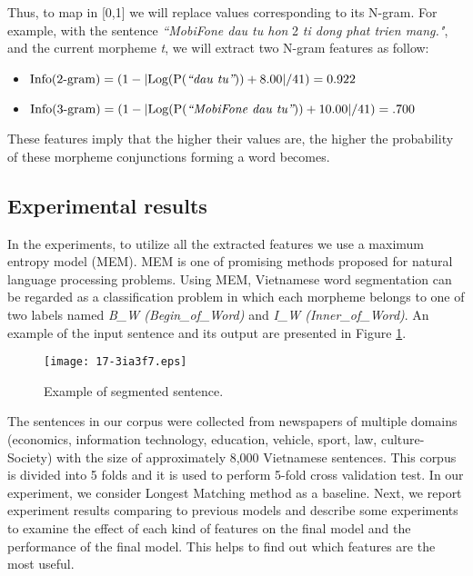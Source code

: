 \documentclass[english]{jnlp_1.4}
\begin{document}
 Thus, to map in [0,1] we will replace values corresponding to its N-gram.
  For example, with the sentence \textit{``MobiFone dau tu hon} 2 \textit{ti dong phat trien mang."}, 
and the current morpheme \emph{t}, we will extract two N-gram features as follow:
\begin{itemize}
  \item $\text{Info(2-gram)} = (1 - |\text{Log(P({\itshape ``dau tu''}))} + 8.00|/41) = 0.922$
  \item $\text{Info(3-gram)} = (1 - |\text{Log(P({\itshape ``MobiFone dau tu''}))} + 10.00|/41) = .700$
\end{itemize}
These features imply that the higher their values are, the higher the
probability of these morpheme conjunctions forming a word becomes.


\subsection{Experimental results}

In the experiments, to utilize all the extracted features we use a maximum entropy model (MEM).
MEM is one of promising methods proposed for natural language processing problems.
Using MEM, Vietnamese word segmentation can be regarded as
a classification problem in which each morpheme belongs to one of two
labels named \emph{B\_W (Begin\_of\_Word)} and \emph{I\_W (Inner\_of\_Word)}.
An example of the input sentence and its output are presented in Figure \ref{f14}.

\begin{figure}[b]
\begin{center}
\texttt{[image: 17-3ia3f7.eps]}
\caption{Example of segmented sentence.}\label{f14}
\end{center}
\end{figure}

The sentences in our corpus were collected from newspapers of multiple domains (economics, information technology, education,
vehicle, sport, law, culture-Society) with the size of approximately 8,000 Vietnamese sentences. This corpus is divided
into 5 folds and it is used to perform 5-fold cross validation test.
In our experiment, we consider Longest Matching method as a baseline. Next, we report experiment
results comparing to previous models and describe some experiments to examine
the effect of each kind of features on the final model and the performance of the final model.
This helps to find out which features are the most useful.
\end{document}

